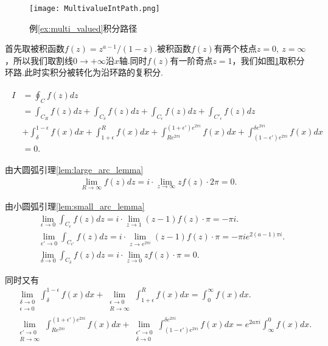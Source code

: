         \begin{figure}
            \centering
            \texttt{[image: MultivalueIntPath.png]}
            \caption{例\ref{ex:multi_valued}积分路径}
            \label{fig:MultivalueIntPath}
        \end{figure}

        \begin{solution}
            首先取被积函数$f(z)=z^{a-1}/(1-z)$.被积函数$f(z)$有两个枝点$z=0,\ z=\infty$，所以我们取割线$0\to +\infty$沿$x$轴.同时$f(z)$有一阶奇点$z=1$，我们如图\ref{fig:MultivalueIntPath}取积分环路.此时实积分被转化为沿环路的复积分.

            \begin{align}
                \begin{split}\label{eq:multi_valued_integral}
                    I&=\oint_C f(z)dz\\ &=\int_{C_R}f(z)dz+\int_{C_\delta}f(z)dz+\int_{C_\epsilon}f(z)dz+\int_{C'_\epsilon}f(z)dz\\ &+\int_{\delta}^{1-\epsilon}f(x)dx+\int_{1+\epsilon}^{R}f(x)dx+\int_{Re^{2\pi i}}^{(1+\epsilon')e^{2\pi i}}f(x)dx+\int_{(1-\epsilon')e^{2\pi i}}^{\delta e^{2\pi i}}f(x)dx\\ &=0.
                \end{split}
            \end{align}

            由大圆弧引理\ref{lem:large_arc_lemma}
            \begin{align*}
                \lim_{R\to\infty}f(z)dz=i\cdot\lim_{z\to\infty}zf(z)\cdot 2\pi=0.
            \end{align*}

            由小圆弧引理\ref{lem:small_arc_lemma}
            \begin{align*}
                &\lim_{\epsilon\to0}\int_{C_\epsilon}f(z)dz=i\cdot\lim_{z\to1}(z-1)f(z)\cdot\pi=-\pi i.\\
                &\lim_{\epsilon'\to0}\int_{C_{\epsilon'}}f(z)dz=i\cdot\lim_{z\to e^{2\pi i}}(z-1)f(z)\cdot\pi=-\pi ie^{2(a-1)\pi i}.\\
                &\lim_{\delta\to0}\int_{C_\delta}f(z)dz=i\cdot\lim_{z\to0}zf(z)\cdot\pi=0.
            \end{align*}

            同时又有
            \begin{align*}
                &\lim_{\substack{\delta\to0 \\ \epsilon\to0}}\int_{\delta}^{1-\epsilon}f(x)dx+\lim_{\substack{\epsilon \to0\\ R\to\infty}}\int_{1+\epsilon}^{R}f(x)dx=\int_{0}^{\infty}f(x)dx.\\
                &\lim_{\substack{\epsilon' \to0 \\ R\to\infty}}\int_{Re^{2\pi i}}^{(1+\epsilon')e^{2\pi i}}f(x)dx+\lim_{\substack{\epsilon' \to0 \\ \delta\to0}}\int_{(1-\epsilon')e^{2\pi i}}^{\delta e^{2\pi i}}f(x)dx=e^{2a\pi i}\int_{\infty}^{0}f(x)dx.
            \end{align*}


\end{solution}
